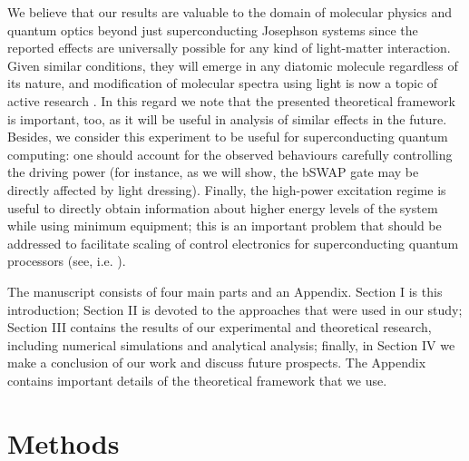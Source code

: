 \documentclass[%
 aps, prx,
 amsmath,amssymb,
 reprint,%
superscriptaddress
]{revtex4-2}
\begin{document}
We believe that our results are valuable to the domain of molecular physics and quantum optics beyond just superconducting Josephson systems since the reported effects are universally possible for any kind of light-matter interaction. Given similar conditions, they will emerge in any diatomic molecule regardless of its nature, and modification of molecular spectra using light is now a topic of active research \cite{hertzog2019strong}. In this regard we note that the presented theoretical framework is important, too, as it will be useful in analysis of similar effects in the future. Besides, we consider this experiment to be useful for superconducting quantum 
computing: one should account for 
the observed behaviours carefully controlling the 
driving power (for instance, as we will show, the 
bSWAP gate \cite{poletto2012entanglement} may be 
directly affected by light dressing). Finally, the high-power excitation regime is useful to directly obtain information about higher energy levels of the system while using minimum equipment; this is an important problem that should be addressed to facilitate scaling of control electronics for superconducting quantum processors (see, i.e. \cite{hornibrook2015cryogenic}).

The manuscript consists of four main parts and an 
Appendix. Section I is this introduction; Section 
II is devoted to the approaches that were used in 
our study; Section III contains the results of 
our experimental and theoretical research, 
including numerical simulations and analytical 
analysis; finally, in Section IV we make a 
conclusion of our work and discuss future 
prospects. The Appendix contains important 
details of the theoretical framework that we use.


\section{Methods}
\end{document}
